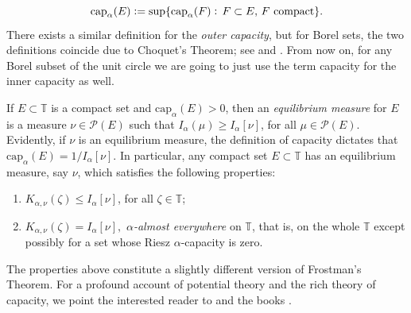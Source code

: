 \documentclass[12pt]{amsart}
\theoremstyle{definition}\newtheorem{remark}[theorem]{Remark}
\theoremstyle{definition}\newtheorem{example}[theorem]{Example}
\theoremstyle{definition}\newtheorem{definition}{Definition}
\numberwithin{equation}{section}
\newcommand\TT{{\mathbb T}}
\begin{document}
\begin{equation*}
    \mathrm{cap}_\alpha(E)\vcentcolon=\sup\{\mathrm{cap}_\alpha(F) \vcentcolon \, F\subset E, \, F \text{ compact}\}.
\end{equation*}
There exists a similar definition for the \textit{outer capacity}, but for Borel sets, the two definitions coincide due to Choquet's Theorem; see \cite[Definition 2.1.8]{Primer} and \cite[Theorem 5.1.2]{Ransford}. From now on, for any Borel subset of the unit circle we are going to just use the term capacity for the inner capacity as well.

If $E\subset \TT$ is a compact set and $\mathrm{cap}_{\alpha}(E)>0$, then an \emph{equilibrium measure} for $E$ is a measure $\nu\in\mathcal{P}(E)$ such that $I_\alpha(\mu)\geq I_\alpha[\nu]$, for all $\mu\in\mathcal{P}(E)$. Evidently, if $\nu$ is an equilibrium measure, the definition of capacity dictates that $\mathrm{cap}_{\alpha}(E)=1/I_\alpha[\nu]$. In particular, any compact set $E\subset \TT$ has an equilibrium measure, say $\nu$, which satisfies the following properties:
\begin{enumerate}
    \item[(i)] $K_{\alpha,\nu}(\zeta)\leq I_{\alpha}[\nu]$, for all $\zeta\in \TT$;
    \item[(ii)] $K_{\alpha,\nu}(\zeta)=I_\alpha[\nu],$ $\alpha$\textit{-almost everywhere} on $\TT$, that is, on the whole $\TT$ except possibly for a set whose Riesz $\alpha$-capacity is zero.
\end{enumerate}

The properties above constitute a slightly different version of Frostman's Theorem. For a profound account of potential theory and the rich theory of capacity, we point the interested reader to \cite{Frostman} and the books \cite{Carleson, Primer, Ransford}.
\end{document}

